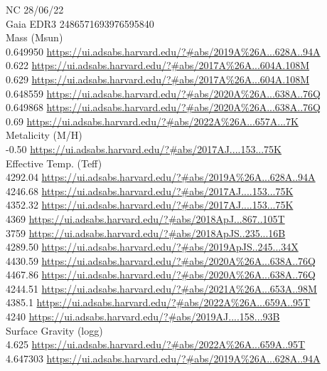 NC 28/06/22\\
Gaia EDR3 2486571693976595840\\

Mass (Msun)\\
0.649950  \url{https://ui.adsabs.harvard.edu/?#abs/2019A%26A...628A..94A}\\
0.622 \url{https://ui.adsabs.harvard.edu/?#abs/2017A%26A...604A.108M}\\
0.629 \url{https://ui.adsabs.harvard.edu/?#abs/2017A%26A...604A.108M}\\
0.648559 \url{https://ui.adsabs.harvard.edu/?#abs/2020A%26A...638A..76Q}\\
0.649868 \url{https://ui.adsabs.harvard.edu/?#abs/2020A%26A...638A..76Q}\\
0.69 \url{https://ui.adsabs.harvard.edu/?#abs/2022A%26A...657A...7K}\\
Metalicity (M/H)\\
-0.50 \url{https://ui.adsabs.harvard.edu/?#abs/2017AJ....153...75K}\\
Effective Temp. (Teff)\\
4292.04 \url{https://ui.adsabs.harvard.edu/?#abs/2019A%26A...628A..94A}\\
4246.68 \url{https://ui.adsabs.harvard.edu/?#abs/2017AJ....153...75K}\\
4352.32 \url{https://ui.adsabs.harvard.edu/?#abs/2017AJ....153...75K}\\
4369 \url{https://ui.adsabs.harvard.edu/?#abs/2018ApJ...867..105T}\\
3759 \url{https://ui.adsabs.harvard.edu/?#abs/2018ApJS..235...16B}\\
4289.50 \url{https://ui.adsabs.harvard.edu/?#abs/2019ApJS..245...34X}\\
4430.59 \url{https://ui.adsabs.harvard.edu/?#abs/2020A%26A...638A..76Q}\\
4467.86 \url{https://ui.adsabs.harvard.edu/?#abs/2020A%26A...638A..76Q}\\
4244.51 \url{https://ui.adsabs.harvard.edu/?#abs/2021A%26A...653A..98M}\\
4385.1 \url{https://ui.adsabs.harvard.edu/?#abs/2022A%26A...659A..95T}\\
4240 \url{https://ui.adsabs.harvard.edu/?#abs/2019AJ....158...93B}\\
Surface Gravity (logg)\\
4.625 \url{https://ui.adsabs.harvard.edu/?#abs/2022A%26A...659A..95T}\\
4.647303 \url{https://ui.adsabs.harvard.edu/?#abs/2019A%26A...628A..94A}\\
